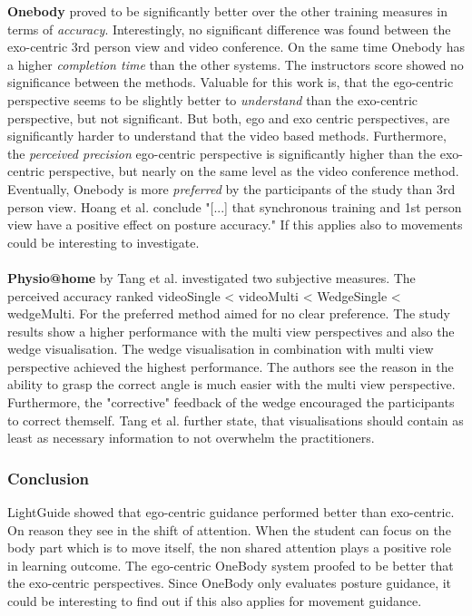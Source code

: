 \textbf{Onebody} \cite{Hoang2016} proved to be significantly better over the other training measures in terms of \textit{accuracy}. Interestingly, no significant difference was found between the exo-centric 3rd person view and video conference. On the same time Onebody has a higher \textit{completion time} than the other systems. The instructors score showed no significance between the methods. Valuable for this work is, that the ego-centric perspective seems to be slightly better to \textit{understand} than the exo-centric perspective, but not significant. But both, ego and exo centric perspectives, are significantly harder to understand that the video based methods. Furthermore, the \textit{perceived precision} ego-centric perspective is significantly higher than the exo-centric perspective, but nearly on the same level as the video conference method. Eventually, Onebody is more \textit{preferred} by the participants of the study than 3rd person view. Hoang et al. conclude "[...] that synchronous training and 1st person view have a positive effect on posture accuracy." If this applies also to movements could be interesting to investigate.\\ \\
\textbf{Physio@home} by Tang et al. \cite{Tang2015} investigated two subjective measures. The perceived accuracy ranked videoSingle < videoMulti < WedgeSingle < wedgeMulti. For the preferred method aimed for no clear preference. The study results show a higher performance with the multi view perspectives and also the wedge visualisation. The wedge visualisation in combination with multi view perspective achieved the highest performance. The authors see the reason in the ability to grasp the correct angle is much easier with the multi view perspective. Furthermore, the "corrective" feedback of the wedge encouraged the participants to correct themself. Tang et al. further state, that visualisations should contain as least as necessary information to not overwhelm the practitioners. 
\subsubsection{Conclusion}
LightGuide showed that ego-centric guidance performed better than exo-centric. On reason they see in the shift of attention. When the student can focus on the body part which is to move itself, the non shared attention plays a positive role in learning outcome. The ego-centric OneBody system proofed to be better that the exo-centric perspectives. Since OneBody only evaluates posture guidance, it could be interesting to find out if this also applies for movement guidance.



